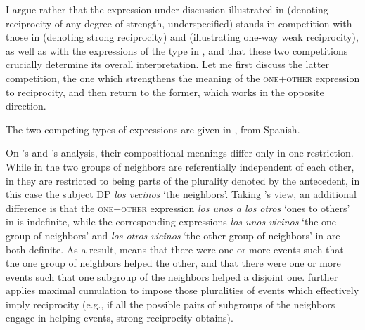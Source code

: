 \documentclass[output=paper,colorlinks,citecolor=brown]{langscibook}
\begin{document}
\noindent I argue rather that the expression under discussion illustrated in  (denoting reciprocity of any degree of strength, underspecified) stands in competition with those in  (denoting strong reciprocity) and  (illustrating one-way weak reciprocity), as well as with the expressions of the type in , and that these two competitions crucially determine its overall interpretation. Let me first discuss the latter competition, the one which strengthens the meaning of the \textsc{one$+$other} expression to reciprocity, and then return to the former, which works in the opposite direction.

The two competing types of expressions are given in , from Spanish.

\ea\label{ex:arsenijevic:Otros}
\label{ex:arsenijevic:Otros-a}

\label{ex:arsenijevic:Otros-b}
 \z \z

\noindent On \citeauthor{v10}'s and \citeauthor{z14}'s analysis, their compositional meanings differ only in one restriction. While in  the two groups of neighbors are referentially independent of each other, in  they are restricted to being parts of the plurality denoted by the antecedent, in this case the subject DP \textit{los vecinos} `the neighbors'. Taking \citeauthor{v10}'s view, an additional difference is that the \textsc{one$+$other} expression \textit{los unos a los otros} `ones to others' in  is indefinite, while the corresponding expressions \textit{los unos vicinos} `the one group of neighbors' and \textit{los otros vicinos} `the other group of neighbors' in  are both definite. As a result,  means that there were one or more events such that the one group of neighbors helped the other, and  that there were one or more events such that one subgroup of the neighbors helped a disjoint one. \citeauthor{v10} further applies max\-i\-mal cumulation to impose those pluralities of events which effectively imply reciprocity (e.g., if all the possible pairs of subgroups of the neighbors engage in helping events, strong reciprocity obtains).
\end{document}
